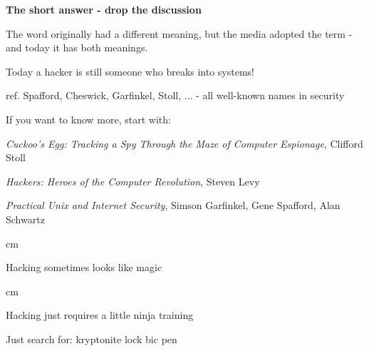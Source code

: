 \documentclass[Screen16to9,17pt]{foils}
\begin{document}

\hlkprofiluk



{\bfseries The short answer - drop the discussion}

The word originally had a different meaning, but the media adopted
the term - and today it has both meanings.

{\color{red}\hlkbig Today a hacker is still someone who breaks into systems!}

ref. Spafford, Cheswick, Garfinkel, Stoll, ...
- all well-known names in security

If you want to know more, start with:
\begin{list2}
\item \emph{Cuckoo's Egg: Tracking a Spy Through the Maze of Computer
 Espionage},  Clifford Stoll
\item \emph{Hackers: Heroes of the Computer Revolution},
Steven Levy
\item \emph{Practical Unix and Internet Security},
Simson Garfinkel, Gene Spafford, Alan Schwartz
\end{list2}




 cm

\centerline{Hacking sometimes looks like magic}




 cm
\centerline{Hacking just requires a little ninja training}



\begin{list1}
\item Just search for: kryptonite lock bic pen
\item {}
\end{list1}




{\small{}}
\end{document}
